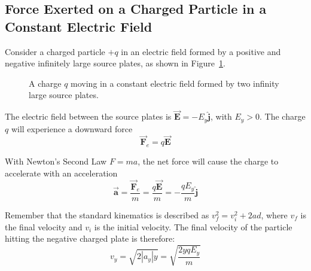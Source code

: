 \subsection{Force Exerted on a Charged Particle in a Constant Electric Field}
Consider a charged particle $+q$ in an electric field formed by a positive and negative infinitely large source plates, as shown in Figure~\ref{fig:electric-field-of-source-plates}. 
\begin{figure}[H]
\centering
{}
  \caption{A charge $q$ moving in a constant electric field formed by two infinity large source plates.}
  \label{fig:electric-field-of-source-plates}
\end{figure}

The electric field between the source plates is $\vec{\boldsymbol{E}}=-E_y\hat{\boldsymbol{j}}$, with $E_y>0$. The charge $q$ will experience a downward force
\begin{equation*}
  \vec{\boldsymbol{F}}_e = q \vec{\boldsymbol{E}}
\end{equation*}

With Newton's Second Law $F=ma$, the net force will cause the charge to accelerate with an acceleration
\begin{equation*}
  \vec{\boldsymbol{a}} = \frac{\vec{\boldsymbol{F}}_e}{m} = \frac{q\vec{\boldsymbol{E}}}{m}
  = -\frac{qE_y}{m}\hat{\boldsymbol{j}}
\end{equation*}

Remember that the standard kinematics is described as $v_f^2=v_i^2+2ad$, where $v_f$ is the final velocity and $v_i$ is the initial velocity. The final velocity of the particle hitting the negative charged plate is therefore:
\begin{equation*}
  v_y = \sqrt{2|a_y|y} = \sqrt{\frac{2yqE_y}{m}}
\end{equation*}

